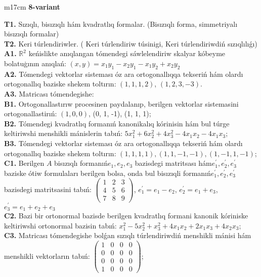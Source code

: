 \documentclass{article}
\begin{document}
\vspace{1cm}


\begin{tabular}{m{17cm}}
\textbf{8-variant}
\newline

\textbf{T1.} Sızıqlı, bisızıqlı hám kvadratlıq formalar. (Bisızıqlı forma,  simmetriyalı bisızıqlı formalar)  \\
\textbf{T2.} Keri túrlendiriwler. ( Keri túrlendiriw túsinigi,   Keri túrlendiriwdiń sızıqlılıǵı) \\
\textbf{A1.} \(\mathbb{R}^{2}\) keńislikte anıqlangan tómendegi sáwlelendiriw skalyar kóbeyme bolatuģının anıqlań: \((x,y) = x_{1}y_{1} - x_{2}y_{1} - x_{1}y_{2} + x_{2}y_{2}\) \\
\textbf{A2.} Tómendegi vektorlar sisteması óz ara ortogonallıqqa tekseriń hám olardı ortogonallıq baziske shekem toltırın: \((1,1,1,2)\), \((1,2,3, - 3)\). \\
\textbf{A3.} Matricası tómendegishe: \\
\textbf{B1.} Ortogonallastırıw procesinen paydalanıp, berilgen vektorlar sistemasini ortogonallastirıń: \((1,0,0)\), (0, 1, -1), (1, 1, 1); \\
\textbf{B2.} Tómendegi kvadratlıq formanıń kanonikalıq kórinisin hám bul túrge keltiriwshi menshikli mánislerin tabıń: \(5x_{1}^{2} + 6x_{2}^{2} + 4x_{3}^{2} - 4x_{1}x_{2} - 4x_{1}x_{3}\); \\
\textbf{B3.} Tómendegi vektorlar sisteması óz ara ortogonallıqqa tekseriń hám olardı ortogonallıq baziske shekem toltırın: \((1,1,1,1),(1,1, - 1, - 1),(1, - 1,1, - 1)\); \\
\textbf{C1.} Berilgen \(A\) bisızıqlı formanıń\(e_{1},e_{2},e_{3}\) bazisdegi matritsası hám\(e_{1}^{'},e_{2}^{'},e_{3}^{'}\) baziske ótiw formulaları berilgen bolsa, onda bul bisızıqli formanıń\(e_{1}^{'},e_{2}^{'},e_{3}^{'}\) bazisdegi matritsasini tabıń: \(\begin{pmatrix} 1 & 2 & 3 \\ 4 & 5 & 6 \\ 7 & 8 & 9 \end{pmatrix}\), \(e_{1}^{'} = e_{1} - e_{2}\), \(e_{2}^{'} = e_{1} + e_{3}\), \(e_{3}^{'} = e_{1} + e_{2} + e_{3}\) \\
\textbf{C2.} Bazi bir ortonormal bazisde berilgen kvadratlıq formani kanonik kóriniske keltiriwshi ortonormal bazisin tabıń: \(x_{1}^{2} - 5x_{2}^{2} + x_{3}^{2} + 4x_{1}x_{2} + 2x_{1}x_{3} + 4x_{2}x_{3}\); \\
\textbf{C3.} Matricası tómendegishe bolǵan sızıqlı túrlendiriwdiń menshikli mánisi hám menshikli vektorların tabıń: \(\begin{pmatrix} 1 & 0 & 0 & 0 \\ 0 & 0 & 0 & 0 \\ 0 & 0 & 0 & 0 \\ 1 & 0 & 0 & 0 \end{pmatrix}\); \\

\end{tabular}
\vspace{1cm}
\end{document}
